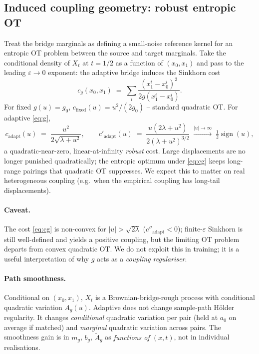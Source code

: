 \documentclass[11pt]{article}
\begin{document}
\subsection{Induced coupling geometry: robust entropic OT}
\label{sec:coupling}

Treat the bridge marginals as defining a small-noise reference kernel
for an entropic OT problem between the source and target marginals.
Take the conditional density of $X_t$ at $t = 1/2$ as a function of
$(x_0, x_1)$ and pass to the leading $\varepsilon\to 0$ exponent: the
adaptive bridge induces the Sinkhorn cost
\begin{equation}
    \boxed{
    c_g(x_0, x_1) \;=\; \sum_i \frac{(x_1^i-x_0^i)^2}{2 g(x_1^i-x_0^i)}.
    }
    \label{eq:cg}
\end{equation}
For fixed $g(u)=g_0$, $c_{\text{fixed}}(u) = u^2/(2g_0)$ -- standard
quadratic OT. For adaptive \eqref{eq:g},
\begin{equation}
    c_{\text{adapt}}(u) \;=\; \frac{u^2}{2\sqrt{\lambda + u^2}},
    \qquad
    c'_{\text{adapt}}(u) \;=\; \frac{u(2\lambda + u^2)}{2(\lambda+u^2)^{3/2}}
    \;\xrightarrow{|u|\to\infty}\;\tfrac12\operatorname{sign}(u),
    \label{eq:cgrad}
\end{equation}
a quadratic-near-zero, linear-at-infinity \emph{robust} cost. Large
displacements are no longer punished quadratically; the entropic optimum
under \eqref{eq:cg} keeps long-range pairings that quadratic OT
suppresses. We expect this to matter on real heterogeneous coupling
(e.g.\ when the empirical coupling has long-tail displacements).

\paragraph{Caveat.} The cost \eqref{eq:cg} is non-convex for
$|u|>\sqrt{2\lambda}$ ($c''_{\text{adapt}}<0$); finite-$\varepsilon$
Sinkhorn is still well-defined and yields a positive coupling, but the
limiting OT problem departs from convex quadratic OT. We do not exploit
this in training; it is a useful interpretation of why $g$ acts as a
\emph{coupling regulariser}.

\paragraph{Path smoothness.} Conditional on $(x_0, x_1)$, $X_t$ is a
Brownian-bridge-rough process with conditional quadratic variation
$A_g(u)$. Adaptive does not change sample-path Hölder regularity. It
changes \emph{conditional} quadratic variation per pair (held at $a_0$
on average if matched) and \emph{marginal} quadratic variation across
pairs. The smoothness gain is in $m_g$, $b_g$, $\widetilde A_g$ as
\emph{functions of $(x,t)$}, not in individual realisations.
\end{document}
